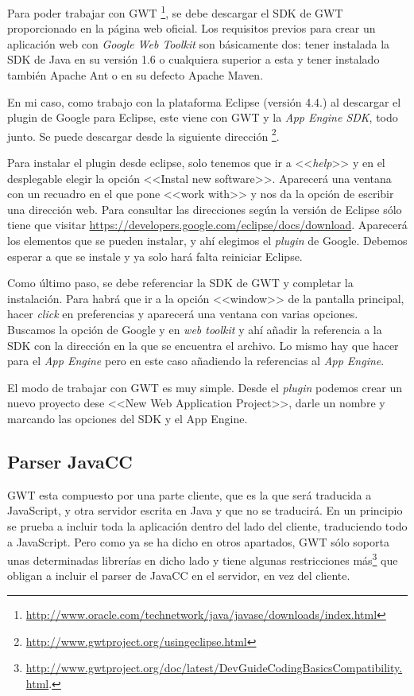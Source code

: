 Para poder trabajar con GWT \footnote{\url{http://www.oracle.com/technetwork/java/javase/downloads/index.html}}, se debe descargar el SDK de GWT proporcionado en la página web oficial. Los requisitos previos para crear un aplicación web con \emph{Google Web Toolkit} son básicamente dos: tener instalada la SDK de Java en su versión 1.6 o cualquiera superior a esta y tener instalado también Apache Ant o en su defecto Apache Maven.

En mi caso, como trabajo con la plataforma Eclipse (versión 4.4.) al descargar el plugin de Google para Eclipse, este viene con GWT y la \emph{App Engine SDK}, todo junto. Se puede descargar desde la siguiente dirección \footnote{\url{http://www.gwtproject.org/usingeclipse.html}}.

Para instalar el plugin desde eclipse, solo tenemos que ir a <<\emph{help}>> y en el desplegable elegir la opción <<Instal new software>>. Aparecerá una ventana con un recuadro en el que pone <<work with>> y nos da la opción de escribir una dirección web. Para consultar las direcciones según la versión de Eclipse sólo tiene que visitar \url{https://developers.google.com/eclipse/docs/download}.
Aparecerá los elementos que se pueden instalar, y ahí elegimos el \emph{plugin} de Google. Debemos esperar a que se instale y ya solo hará falta reiniciar Eclipse.

Como último paso, se debe referenciar la SDK de GWT y completar la instalación. Para habrá que ir a la opción <<window>> de la pantalla principal, hacer \emph{click} en preferencias y aparecerá una ventana con varias opciones. Buscamos la opción de Google y en \emph{web toolkit} y ahí añadir la referencia a la SDK con la dirección en la que se encuentra el archivo. Lo mismo hay que hacer para el \emph{App Engine} pero en este caso añadiendo la referencias al \emph{App Engine}.

El modo de trabajar con GWT es muy simple. Desde el \emph{plugin} podemos crear un nuevo proyecto dese <<New Web Application Project>>, darle un nombre y marcando las opciones del SDK y el App Engine.

 
\subsection{Parser JavaCC}

GWT esta compuesto por una parte cliente, que es la que será traducida a JavaScript, y otra servidor escrita en Java y que no se traducirá. En un principio se prueba a incluir toda la aplicación dentro del lado del cliente, traduciendo todo a JavaScript. Pero como ya se ha dicho en otros apartados, GWT sólo soporta unas determinadas librerías en dicho lado y tiene algunas restricciones más\footnote{\url{http://www.gwtproject.org/doc/latest/DevGuideCodingBasicsCompatibility.html}.} que obligan a incluir el parser de JavaCC en el servidor, en vez del cliente.


